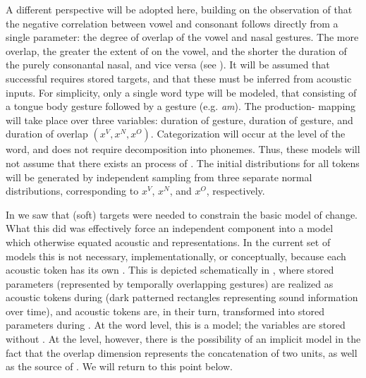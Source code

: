 A different perspective will be adopted here, building on the observation
of \citet{Beddor2009} that the negative correlation between vowel
 and consonant  follows directly from a single 
parameter: the degree of overlap of the vowel and nasal gestures.
The more overlap, the greater the extent of  on the vowel,
and the shorter the duration of the purely consonantal nasal, and
vice versa (see ). It will be assumed
that successful  requires stored  targets, and
that these must be inferred from acoustic inputs. For simplicity,
only a single word type will be modeled, that consisting of a tongue
body gesture followed by a  gesture (e.g. \textit{am}). The production-
mapping will take place over three  variables: duration of
 gesture, duration of  gesture, and duration of 
overlap $(x^{V},x^{N},x^{O})$. Categorization will occur at the level
of the word, and does not require decomposition into phonemes. Thus,
these models will not assume that there exists an  process
of . The initial distributions for all tokens will
be generated by independent sampling from three separate normal distributions,
corresponding to $x^{V}$, $x^{N}$, and $x^{O}$, respectively. 

In  we saw that (soft) targets\largerpage
were needed to constrain the basic  model of change. What
this did was effectively force an independent  component
into a model which otherwise equated acoustic and  representations.
In the current set of models this is not necessary, implementationally,
or conceptually, because each acoustic token has its own 
. This is depicted schematically in ,
where stored  parameters (represented by temporally overlapping
 gestures) are realized as acoustic tokens during 
(dark patterned rectangles representing sound  information
over time), and acoustic tokens are, in their turn, transformed into
stored  parameters during . At the word level,
this is a  model; the  variables are stored
without . At the  level, however, there is the
possibility of an implicit  model in the fact that the
overlap dimension represents the concatenation of two units, as well
as the source of . We will return to this point below.

